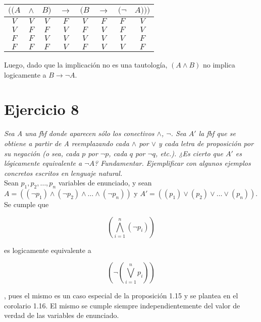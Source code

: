\documentclass[osajnl,twocolumn,showpacs,superscriptaddress,10pt]{revtex4-1} %
\begin{document}
\begin{enumerate}[i-]
  \begin{table}[h!]
    \setlength{\tabcolsep}{1.0em}
    \centering
    \begin{tabular}{ccc|c|cccc}
      $((A$ & $\wedge$ & $B)$ & $\rightarrow$ & $(B$ & $\rightarrow$ & $(\neg$ & $A)))$ \\
      \hline
      $V$ & $V$ & $V$ & $F$ & $V$ & $F$ & $F$ & $V$ \\
      $V$ & $F$ & $F$ & $V$ & $F$ & $V$ & $F$ & $V$ \\
      $F$ & $F$ & $V$ & $V$ & $V$ & $V$ & $V$ & $F$ \\
      $F$ & $F$ & $F$ & $V$ & $F$ & $V$ & $V$ & $F$
    \end{tabular}
  \end{table}

  Luego, dado que la implicación no es una tautología, $(A \wedge B)$ no implica logicamente a $B \rightarrow \neg A$. \\
\end{enumerate}

\section{Ejercicio 8}

\textit{Sea A una fbf donde aparecen sólo los conectivos $\wedge$, $\neg$. Sea $A'$ la fbf que se obtiene a partir de A reemplazando cada $\wedge$ por $\vee$ y cada letra de proposición por su negación (o sea, cada $p$ por $\neg p$, cada $q$ por $\neg q$, etc.). ¿Es cierto que $A'$ es lógicamente equivalente a $\neg A$? Fundamentar. Ejemplificar con algunos ejemplos concretos escritos en lenguaje natural.} \\

Sean $p_1, p_2, \ldots, p_n$ variables de enunciado, y sean $A = ((\neg p_1) \wedge (\neg p_2) \wedge \ldots \wedge (\neg p_n))$ y $A' = ((p_1) \vee (p_2) \vee \ldots \vee (p_n))$. Se cumple que

\begin{equation}
  \left(\bigwedge_{i=1}^{n}{(\neg p_i)}\right)
\end{equation}

es logicamente equivalente a

\begin{equation}
  \left(\neg \left(\bigvee_{i=1}^{n}{p_i}\right)\right)
\end{equation}

, pues el mismo es un caso especial de la proposición 1.15 y se plantea en el corolario 1.16. El mismo se cumple siempre independientemente del valor de verdad de las variables de enunciado. \\
\end{document}

